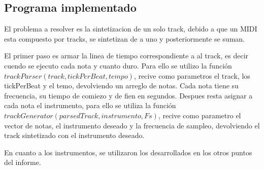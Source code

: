 \documentclass[../ASSD_TP2.tex]{subfiles}
\begin{document}
\subsection*{Programa implementado}
El problema a resolver es la sintetizacion de un solo track, debido a que un MIDI esta compuesto por tracks, se sintetizan de a uno y posteriormente se suman.
\par El primer paso es armar la linea de tiempo correspondiente a al track, es decir cuendo se ejecuto cada nota y cuanto duro. Para ello se utilizo la función $trackParser (track,tickPerBeat,tempo)$, recive como parametros el track, los tickPerBeat y el temo, devolviendo un arreglo de notas. Cada nota tiene su frecuencia, su tiempo de comiezo y de fien en segundos.
Despues resta asignar a cada nota el instrumento, para ello se utiliza la función $trackGenerator(parsedTrack,instrumento,Fs)$, recive como parametro el vector de notas, el instrumento deseado y la frecuencia de sampleo, devolviendo el track sintetizado con el instrumento deseado.
\par En cuanto a los instrumentos, se utilizaron los desarrollados en los otros  puntos del informe.
\end{document}

